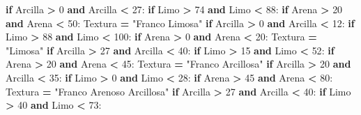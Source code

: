 \documentclass[
]{article}
\newenvironment{Shaded}{\begin{snugshade}}{\end{snugshade}}
\newcommand{\ControlFlowTok}[1]{\textcolor[rgb]{0.13,0.29,0.53}{\textbf{#1}}}
\newcommand{\DecValTok}[1]{\textcolor[rgb]{0.00,0.00,0.81}{#1}}
\newcommand{\KeywordTok}[1]{\textcolor[rgb]{0.13,0.29,0.53}{\textbf{#1}}}
\newcommand{\NormalTok}[1]{#1}
\newcommand{\OperatorTok}[1]{\textcolor[rgb]{0.81,0.36,0.00}{\textbf{#1}}}
\newcommand{\StringTok}[1]{\textcolor[rgb]{0.31,0.60,0.02}{#1}}
\begin{document}
\begin{Shaded}
\begin{Highlighting}[]
  \ControlFlowTok{if}\NormalTok{ Arcilla }\OperatorTok{\textgreater{}} \DecValTok{0} \KeywordTok{and}\NormalTok{ Arcilla }\OperatorTok{\textless{}} \DecValTok{27}\NormalTok{:}
    \ControlFlowTok{if}\NormalTok{ Limo }\OperatorTok{\textgreater{}} \DecValTok{74} \KeywordTok{and}\NormalTok{ Limo }\OperatorTok{\textless{}} \DecValTok{88}\NormalTok{:}
      \ControlFlowTok{if}\NormalTok{ Arena }\OperatorTok{\textgreater{}} \DecValTok{20} \KeywordTok{and}\NormalTok{ Arena }\OperatorTok{\textless{}} \DecValTok{50}\NormalTok{:}
\NormalTok{        Textura }\OperatorTok{=} \StringTok{"Franco Limosa"}
  \ControlFlowTok{if}\NormalTok{ Arcilla }\OperatorTok{\textgreater{}} \DecValTok{0} \KeywordTok{and}\NormalTok{ Arcilla }\OperatorTok{\textless{}} \DecValTok{12}\NormalTok{:}
    \ControlFlowTok{if}\NormalTok{ Limo }\OperatorTok{\textgreater{}} \DecValTok{88} \KeywordTok{and}\NormalTok{ Limo }\OperatorTok{\textless{}} \DecValTok{100}\NormalTok{:}
      \ControlFlowTok{if}\NormalTok{ Arena }\OperatorTok{\textgreater{}} \DecValTok{0} \KeywordTok{and}\NormalTok{ Arena }\OperatorTok{\textless{}} \DecValTok{20}\NormalTok{:}
\NormalTok{        Textura }\OperatorTok{=} \StringTok{"Limosa"}
  \ControlFlowTok{if}\NormalTok{ Arcilla }\OperatorTok{\textgreater{}} \DecValTok{27} \KeywordTok{and}\NormalTok{ Arcilla }\OperatorTok{\textless{}} \DecValTok{40}\NormalTok{:}
    \ControlFlowTok{if}\NormalTok{ Limo }\OperatorTok{\textgreater{}} \DecValTok{15} \KeywordTok{and}\NormalTok{ Limo }\OperatorTok{\textless{}} \DecValTok{52}\NormalTok{:}
      \ControlFlowTok{if}\NormalTok{ Arena }\OperatorTok{\textgreater{}} \DecValTok{20} \KeywordTok{and}\NormalTok{ Arena }\OperatorTok{\textless{}} \DecValTok{45}\NormalTok{:}
\NormalTok{        Textura }\OperatorTok{=} \StringTok{"Franco Arcillosa"}
  \ControlFlowTok{if}\NormalTok{ Arcilla }\OperatorTok{\textgreater{}} \DecValTok{20} \KeywordTok{and}\NormalTok{ Arcilla }\OperatorTok{\textless{}} \DecValTok{35}\NormalTok{:}
    \ControlFlowTok{if}\NormalTok{ Limo }\OperatorTok{\textgreater{}} \DecValTok{0} \KeywordTok{and}\NormalTok{ Limo }\OperatorTok{\textless{}} \DecValTok{28}\NormalTok{:}
      \ControlFlowTok{if}\NormalTok{ Arena }\OperatorTok{\textgreater{}} \DecValTok{45} \KeywordTok{and}\NormalTok{ Arena }\OperatorTok{\textless{}} \DecValTok{80}\NormalTok{:}
\NormalTok{        Textura }\OperatorTok{=} \StringTok{"Franco Arenoso Arcillosa"}
  \ControlFlowTok{if}\NormalTok{ Arcilla }\OperatorTok{\textgreater{}} \DecValTok{27} \KeywordTok{and}\NormalTok{ Arcilla }\OperatorTok{\textless{}} \DecValTok{40}\NormalTok{:}
    \ControlFlowTok{if}\NormalTok{ Limo }\OperatorTok{\textgreater{}} \DecValTok{40} \KeywordTok{and}\NormalTok{ Limo }\OperatorTok{\textless{}} \DecValTok{73}\NormalTok{:}

\end{Highlighting}
\end{Shaded}
\end{document}

